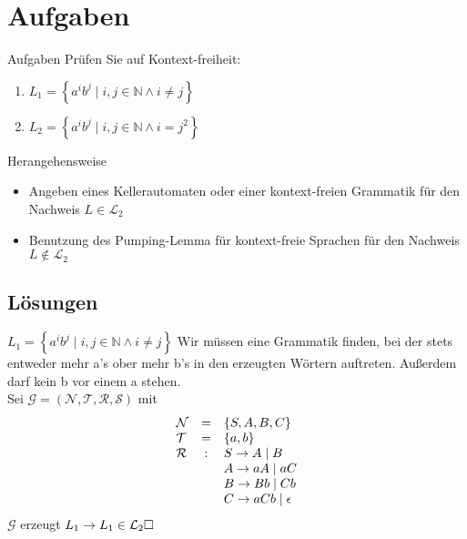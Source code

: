 \documentclass[]{beamer}
\begin{document}
\section{Aufgaben}
\begin{frame}[squeeze]{}
  \begin{alertblock}{Aufgaben}
    Prüfen Sie auf Kontext-freiheit:
    \begin{enumerate}
      \item $L_1 = \left\{ a^i b^j \;|\; i, j \in \mathbb{N} \wedge i \neq j \right\}$
      \item $L_2 = \left\{ a^i b^j \;|\; i, j \in \mathbb{N} \wedge i = j^2 \right\}$
    \end{enumerate}
  \end{alertblock}
  
  \begin{block}{Herangehensweise}
    \begin{itemize}
      \item Angeben eines Kellerautomaten oder einer kontext-freien Grammatik für den Nachweis $L \in \mathcal{L}_2$
      \item Benutzung des Pumping-Lemma für kontext-freie Sprachen für den Nachweis $L \notin \mathcal{L}_2$
    \end{itemize}
  \end{block}
\end{frame}

\subsection{Lösungen}
\begin{frame}[squeeze]{}
  \begin{exampleblock}{$L_1 = \left\{ a^i b^j \;|\; i, j \in \mathbb{N} \wedge i \neq j \right\}$}
  Wir müssen eine Grammatik finden, bei der stets entweder mehr a's ober mehr b's in den erzeugten Wörtern auftreten. Außerdem darf kein b vor einem a stehen. \\
  \pause
  \vspace*{1em}
  Sei $\mathcal{G} = \left( \mathcal{N}, \mathcal{T}, \mathcal{R}, \mathcal{S} \right)$ mit
  \[\begin{array}{l c l}
      \mathcal{N} & = & \left\{ S, A, B, C \right\} \\
      \mathcal{T} & = & \left\{ a, b \right\} \\
      \mathcal{R} & : & S \rightarrow A \;|\; B \\
                  &   & A \rightarrow aA \;|\; aC \\
                  &   & B \rightarrow Bb \;|\; Cb \\
                  &   & C \rightarrow aCb \;|\; \epsilon \\
    \end{array}\]
  $\mathcal{G}$ erzeugt $L_1 \to L_1 \in \mathcal{L}_2 \hfill \square$
  \end{exampleblock}
\end{frame}
\end{document}
